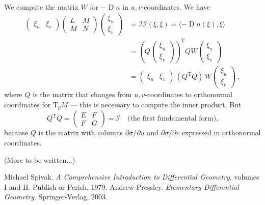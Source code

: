 \documentclass[12pt]{article}
\DeclareMathOperator{\D}{D}
\newcommand{\TpM}{\mathrm{T}_p M}
\newcommand{\ctwo}{\mathcal{II}}
\begin{document}
We compute the matrix $W$ for $-\D n$ in $u,v$-coordinates.
We have
\begin{align*}
\begin{pmatrix}
\xi_u & \xi_v
\end{pmatrix}
\begin{pmatrix}
L & M \\
M & N
\end{pmatrix} 
\begin{pmatrix}
\xi_u \\ \xi_v
\end{pmatrix}
&= \ctwo(\xi, \xi) = \langle -\D n(\xi), \xi \rangle \\
&= \left(
Q \begin{pmatrix}
\xi_u \\
\xi_v
\end{pmatrix}
\right)^\mathrm{T}
Q W \begin{pmatrix}
\xi_u \\
\xi_v
\end{pmatrix} \\
&= 
\begin{pmatrix}
\xi_u &
\xi_v
\end{pmatrix}
\, (Q^\mathrm{T}
Q) \, W \begin{pmatrix}
\xi_u \\
\xi_v
\end{pmatrix}\,,
\end{align*}
where $Q$ is the matrix that changes from $u,v$-coordinates to orthonormal
coordinates for $\TpM$ --- this is necessary to compute the inner product.
But 
\[
Q^\mathrm{T} Q = \begin{pmatrix}
E & F \\
F & G
\end{pmatrix} = \mathcal{I} \quad \text{(the first fundamental form),}
\]
because $Q$ is the matrix
with columns $\partial\sigma/\partial u$ and $\partial\sigma/\partial v$
expressed in orthonormal coordinates.

(More to be written...)

\begin{thebibliography}{3}
Michael Spivak.  {\it A Comprehensive Introduction to Differential Geometry}, volumes I and II.
 Publish or Perish, 1979.
Andrew Pressley. {\it Elementary Differential Geometry}.  Springer-Verlag, 2003.
\end{thebibliography}
\end{document}
